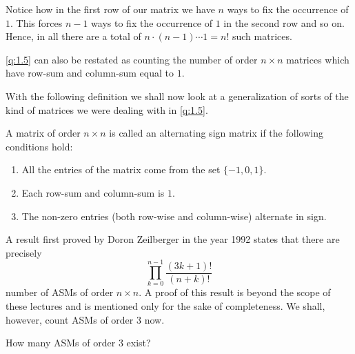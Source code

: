 \begin{solution}
Notice how in the first row of our matrix we have $n$ ways to fix the occurrence of $1$. This forces $n-1$ ways to fix the occurrence of $1$ in the second row and so on. Hence, in all there are a total of $n\cdot \left( n-1 \right) \cdots 1 = n!$ such matrices.
\end{solution}
\begin{remark}
\cref{q:1.5} can also be restated as counting the number of order $n\times n$ matrices which have row-sum and column-sum equal to $1$.    
\end{remark}
With the following definition we shall now look at a generalization of sorts of the kind of matrices we were dealing with in \cref{q:1.5}.
\begin{definition}
	A matrix of order $n\times n$ is called an alternating sign matrix if the following conditions hold:
	\begin{enumerate}
		\item All the entries of the matrix come from the set $\{-1,0,1\}$.
		\item Each row-sum and column-sum is $1$.
		\item The non-zero entries (both row-wise and column-wise) alternate in sign.
	\end{enumerate}
\end{definition}
A result first proved by Doron Zeilberger in the year 1992 states that there are precisely  \[
\prod_{k=0}^{n-1} \frac{\left( 3k+1 \right)!}{\left( n+k \right)!}
\] 
number of ASMs of order $n\times n$. A proof of this result is beyond the scope of these lectures and is mentioned only for the sake of completeness. We shall, however, count ASMs of order $3$ now.
\begin{question}
    How many ASMs of order $3$ exist?
    \label{q:1.6}
\end{question}
